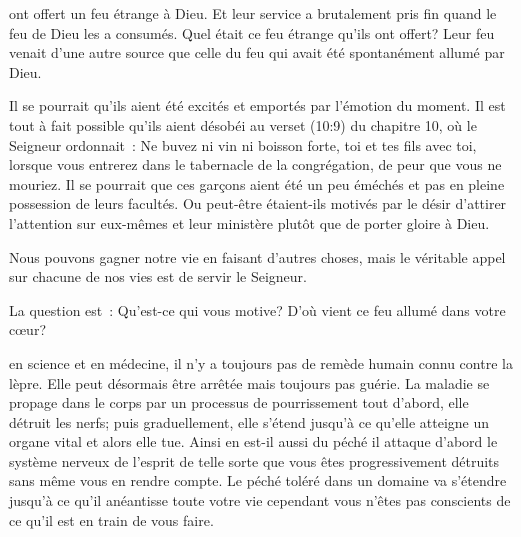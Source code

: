 
 ont offert un feu étrange à Dieu.
 Et leur service a brutalement pris fin quand le feu de Dieu les a consumés.
 Quel était ce feu étrange qu'ils ont offert?
 Leur feu venait d'une autre source que celle du feu
 qui avait été spontanément allumé par Dieu.

Il se pourrait qu'ils aient été excités et emportés par l'émotion du moment.
 Il est tout à fait possible qu'ils aient désobéi au verset
 (10:9) du chapitre 10,
 où le Seigneur ordonnait~:
 \og Ne buvez ni vin ni boisson forte, toi et tes fils avec toi,
 lorsque vous entrerez dans le tabernacle de la congrégation,
 de peur que vous ne mouriez. \fg{}
 Il se pourrait que ces garçons aient été un peu éméchés
 et pas en pleine possession de leurs facultés.
 Ou peut-être étaient-ils motivés par le désir d'attirer
 l'attention sur eux-mêmes et leur ministère plutôt que de porter gloire à Dieu.


Nous pouvons gagner notre vie en faisant d'autres choses,
 mais le véritable appel sur chacune de nos vies est de servir le Seigneur.

La question est~: Qu'est-ce qui vous motive?
 D'où vient ce feu allumé dans votre cœur? 

\dvrule






 en science et en médecine,
 il n'y a toujours pas de remède humain connu contre la lèpre.
 Elle peut désormais être arrêtée mais toujours pas guérie.
 La maladie se propage dans le corps par un processus de pourrissement
 \ocadr{}tout d'abord, elle détruit les nerfs;
 puis graduellement, elle s'étend jusqu'à ce qu'elle atteigne
 un organe vital et alors elle tue.
 Ainsi en est-il aussi du péché \ocadr{}il attaque d'abord le système nerveux
 de l'esprit de telle sorte que vous êtes progressivement détruits
 sans même vous en rendre compte.
 Le péché toléré dans un domaine va s'étendre jusqu'à ce qu'il anéantisse
 toute votre vie \ocadr{}cependant vous n'êtes pas conscients
 de ce qu'il est en train de vous faire. 

